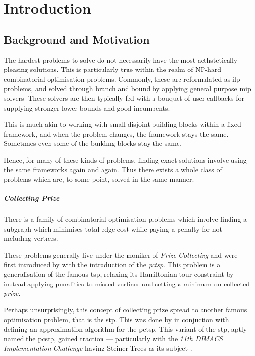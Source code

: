 \chapter{Introduction}
\section{Background and Motivation}\label{sec:intro:background}
The hardest problems to solve do not necessarily have the most aethstetically pleasing solutions.
This is particularly true within the realm of NP-hard combinatorial optimisation problems.
Commonly, these are reformulated as \gls{ilp} problems, and solved through
branch and bound
by applying general purpose
\gls{mip} solvers. These solvers are then typically
fed with a bouquet of user callbacks for supplying
stronger lower bounds and good incumbents.

This is much akin to working with small disjoint building blocks
within a fixed framework, and when the problem changes, the framework stays
the same. Sometimes even some of the building blocks stay the same.

Hence, for many of these kinds of problems, finding exact solutions
involve using the same frameworks again and again.
Thus there exists a whole class of problems which are, to some point,
solved in the same manner.

\paragraph{Collecting Prize}
There is a family of combinatorial optimisation problems which involve
finding a subgraph which minimises total edge cost while paying a penalty
for not including vertices.

These problems generally live under the moniker of \textit{Prize-Collecting}
and were first introduced by \citet*{balas1989prize}
with the introduction of the \textit{\gls{pctsp}}. This problem is a generalisation of
the famous \gls{tsp}, relaxing its Hamiltonian tour constraint by instead applying penalities
to missed vertices and setting a minimum on collected \textit{prize}.

Perhaps unsurprisingly, this concept of collecting prize spread to another famous optimisation
problem, that is the \gls{stp}. This was done by \citet{Bienstock1993} in conjuction with
defining an approximation algorithm for the \gls{pctsp}. This variant of the \gls{stp},
aptly named the \gls{pcstp}, gained traction --- particularly with the
\textit{11th DIMACS Implementation Challenge} having Steiner Trees as its subject
\citep{DIMACS}.


